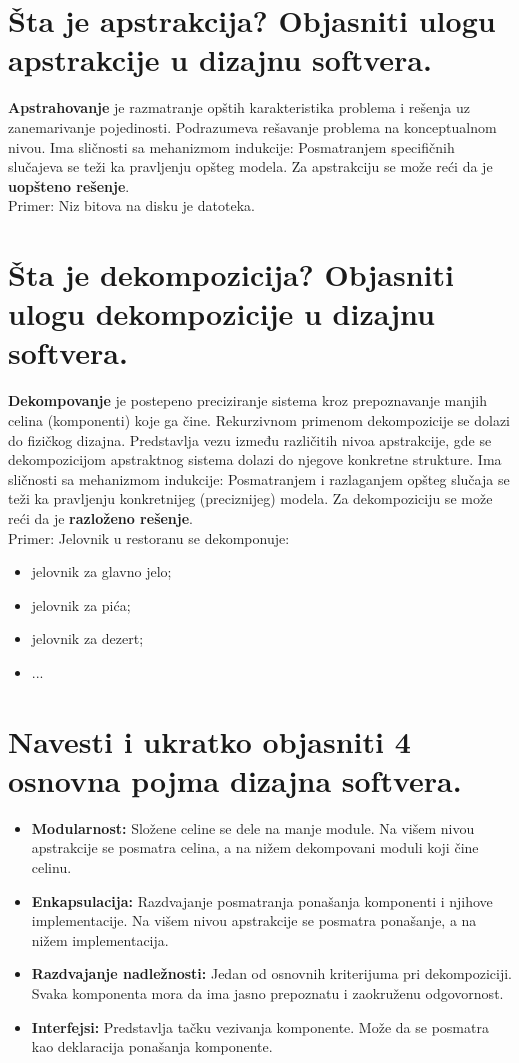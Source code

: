 \documentclass[a4paper]{article}
\begin{document}
\section{Šta je apstrakcija? Objasniti ulogu apstrakcije u dizajnu softvera.}
  \textbf{Apstrahovanje} je razmatranje opštih karakteristika problema i rešenja uz zanemarivanje
  pojedinosti. Podrazumeva rešavanje problema na konceptualnom nivou. Ima sličnosti sa
  mehanizmom indukcije: Posmatranjem specifičnih slučajeva se teži ka pravljenju opšteg modela.
  Za apstrakciju se može reći da je \textbf{uopšteno rešenje}.\\
  \indent Primer: Niz bitova na disku je datoteka.

\section{Šta je dekompozicija? Objasniti ulogu dekompozicije u dizajnu softvera.}
  \textbf{Dekompovanje} je postepeno preciziranje sistema kroz prepoznavanje manjih celina 
  (komponenti) koje ga čine. Rekurzivnom primenom dekompozicije se dolazi do fizičkog dizajna.
  Predstavlja vezu između različitih nivoa apstrakcije, gde se dekompozicijom apstraktnog
  sistema dolazi do njegove konkretne strukture. Ima sličnosti sa mehanizmom indukcije:
  Posmatranjem i razlaganjem opšteg slučaja se teži ka pravljenju konkretnijeg (preciznijeg)
  modela. Za dekompoziciju se može reći da je \textbf{razloženo rešenje}.\\
  \indent Primer: Jelovnik u restoranu se dekomponuje:
  \begin{itemize}
    \item jelovnik za glavno jelo;
    \item jelovnik za pića;
    \item jelovnik za dezert;
    \item ...
  \end{itemize}

\section{Navesti i ukratko objasniti 4 osnovna pojma dizajna softvera.}
  \begin{itemize}
    \item \textbf{Modularnost:} Složene celine se dele na manje module. Na višem nivou apstrakcije
          se posmatra celina, a na nižem dekompovani moduli koji čine celinu.
    \item \textbf{Enkapsulacija:} Razdvajanje posmatranja ponašanja komponenti i njihove
          implementacije. Na višem nivou apstrakcije se posmatra ponašanje, a na nižem
          implementacija.
    \item \textbf{Razdvajanje nadležnosti:} Jedan od osnovnih kriterijuma pri dekompoziciji. Svaka
          komponenta mora da ima jasno prepoznatu i zaokruženu odgovornost.
    \item \textbf{Interfejsi:} Predstavlja tačku vezivanja komponente. Može da se posmatra
          kao deklaracija ponašanja komponente.
  \end{itemize}
\end{document}
